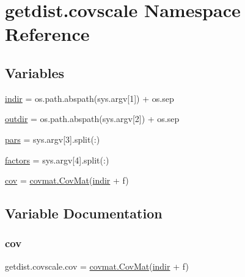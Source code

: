 \hypertarget{namespacegetdist_1_1covscale}{}\section{getdist.\+covscale Namespace Reference}
\label{namespacegetdist_1_1covscale}
\subsection*{Variables}
\begin{DoxyCompactItemize}
\item 
\mbox{\hyperlink{namespacegetdist_1_1covscale_a10e72310144c287856e4e56886468715}{indir}} = os.\+path.\+abspath(sys.\+argv\mbox{[}1\mbox{]}) + os.\+sep
\item 
\mbox{\hyperlink{namespacegetdist_1_1covscale_adabb3a7623744cde4768c412a7136bb5}{outdir}} = os.\+path.\+abspath(sys.\+argv\mbox{[}2\mbox{]}) + os.\+sep
\item 
\mbox{\hyperlink{namespacegetdist_1_1covscale_a70bc377cec82da70dff98f3d3901faa2}{pars}} = sys.\+argv\mbox{[}3\mbox{]}.split(\textquotesingle{}\+:\textquotesingle{})
\item 
\mbox{\hyperlink{namespacegetdist_1_1covscale_a1b853be23f9908104cc9a2a6f3a5babd}{factors}} = sys.\+argv\mbox{[}4\mbox{]}.split(\textquotesingle{}\+:\textquotesingle{})
\item 
\mbox{\hyperlink{namespacegetdist_1_1covscale_a8e215d5aaedcc0fd1d306e9e684063ee}{cov}} = \mbox{\hyperlink{classgetdist_1_1covmat_1_1CovMat}{covmat.\+Cov\+Mat}}(\mbox{\hyperlink{namespacegetdist_1_1covscale_a10e72310144c287856e4e56886468715}{indir}} + f)
\end{DoxyCompactItemize}


\subsection{Variable Documentation}
\mbox{\label{namespacegetdist_1_1covscale_a8e215d5aaedcc0fd1d306e9e684063ee}} 
\subsubsection{\texorpdfstring{cov}{cov}}
{\footnotesize\ttfamily getdist.\+covscale.\+cov = \mbox{\hyperlink{classgetdist_1_1covmat_1_1CovMat}{covmat.\+Cov\+Mat}}(\mbox{\hyperlink{namespacegetdist_1_1covscale_a10e72310144c287856e4e56886468715}{indir}} + f)}

